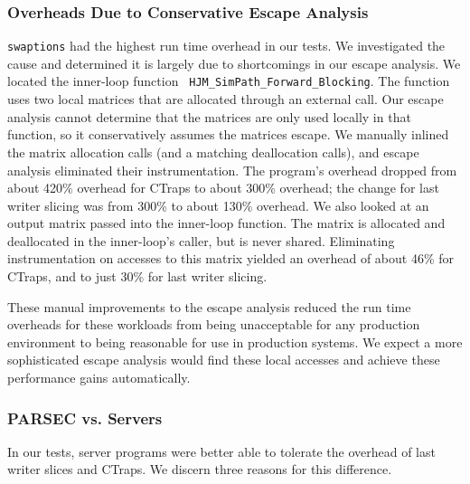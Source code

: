 \documentclass[preprint,9pt]{sigplanconf}
\newcommand{\ctraps}{CTraps\xspace}
\begin{document}
\subsubsection{Overheads Due to Conservative Escape Analysis}
\label{sec:eval:conservative}
{\tt swaptions} had the highest run time overhead in our tests.  We
investigated the cause and determined it is largely due to shortcomings in our
escape analysis.  We located the inner-loop function {\tt
HJM\_SimPath\_Forward\_Blocking}.  The function uses two local matrices that
are allocated through an external call.  Our escape analysis cannot determine
that the matrices are only used locally in that function, so it conservatively
assumes the matrices escape.  We manually inlined the matrix allocation calls
(and a matching deallocation calls), and escape analysis eliminated their
instrumentation.  The program's overhead dropped from about 420\% overhead for
\ctraps to about 300\% overhead; the change for last writer slicing was from
300\% to about 130\% overhead.  We also looked at an output matrix passed into
the inner-loop function.  The matrix is allocated and deallocated in the
inner-loop's caller, but is never shared.  Eliminating instrumentation on
accesses to this matrix yielded an overhead of about 46\% for \ctraps, and to
just 30\% for last writer slicing.  

These manual improvements to the escape analysis reduced the run time overheads
for these workloads from being unacceptable for any production environment to
being reasonable for use in production systems.  We expect a more sophisticated
escape analysis would find these local accesses and achieve these performance
gains automatically.


\subsubsection{PARSEC vs. Servers}
\label{sec:eval:parsecserver}
In our tests, server programs were better able to tolerate the overhead of
last writer slices and \ctraps.   We discern three reasons for this difference.
\end{document}
